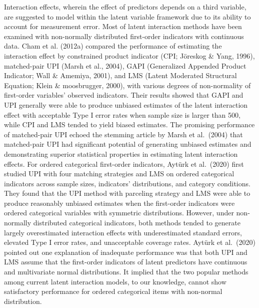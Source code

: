 \documentclass[
  man]{apa6}
\begin{document}
Interaction effects, wherein the effect of predictors depends on a third variable, are suggested to model within the latent variable framework due to its ability to account for measurement error. Most of latent interaction methods have been examined with non-normally distributed first-order indicators with continuous data. Cham et al. (2012a) compared the performance of estimating the interaction effect by constrained product indicator (CPI; Jöreskog \& Yang, 1996), matched-pair UPI (Marsh et al., 2004), GAPI (Generalized Appended Product Indicator; Wall \& Amemiya, 2001), and LMS (Latent Moderated Structural Equation; Klein \& moosbrugger, 2000), with various degrees of non-normality of first-order variables' observed indicators. Their results showed that GAPI and UPI generally were able to produce unbiased estimates of the latent interaction effect with acceptable Type I error rates when sample size is larger than 500, while CPI and LMS tended to yield biased estimates. The promising performance of matched-pair UPI echoed the stemming article by Marsh et al.~(2004) that matched-pair UPI had significant potential of generating unbiased estimates and demonstrating superior statistical properties in estimating latent interaction effects. For ordered categorical first-order indicators, Aytürk et al.~(2020) first studied UPI with four matching strategies and LMS on ordered categorical indicators across sample sizes, indicators' distributions, and category conditions. They found that the UPI method with parceling strategy and LMS were able to produce reasonably unbiased estimates when the first-order indicators were ordered categorical variables with symmetric distributions. However, under non-normally distributed categorical indicators, both methods tended to generate largely overestimated interaction effects with underestimated standard errors, elevated Type I error rates, and unacceptable coverage rates. Aytürk et al.~(2020) pointed out one explanation of inadequate performance was that both UPI and LMS assume that the first-order indicators of latent predictors have continuous and multivariate normal distributions. It implied that the two popular methods among current latent interaction models, to our knowledge, cannot show satisfactory performance for ordered categorical items with non-normal distribution.
\end{document}
